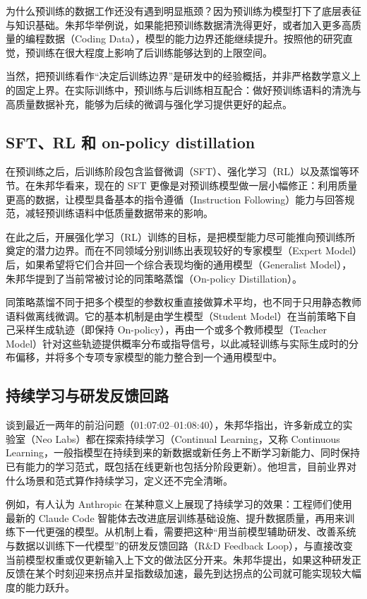 \documentclass[UTF8,a4paper,11pt,fontset=fandol]{ctexart}
\begin{document}
为什么预训练的数据工作还没有遇到明显瓶颈？因为预训练为模型打下了底层表征与知识基础。朱邦华举例说，如果能把预训练数据清洗得更好，或者加入更多高质量的编程数据（Coding Data），模型的能力边界还能继续提升。按照他的研究直觉，预训练在很大程度上影响了后训练能够达到的上限空间。

当然，把预训练看作“决定后训练边界”是研发中的经验概括，并非严格数学意义上的固定上界。在实际训练中，预训练与后训练相互配合：做好预训练语料的清洗与高质量数据补充，能够为后续的微调与强化学习提供更好的起点。

\subsection{SFT、RL 和 on-policy distillation}
在预训练之后，后训练阶段包含监督微调（SFT）、强化学习（RL）以及蒸馏等环节。在朱邦华看来，现在的 SFT 更像是对预训练模型做一层小幅修正：利用质量更高的数据，让模型具备基本的指令遵循（Instruction Following）能力与回答规范，减轻预训练语料中低质量数据带来的影响。

在此之后，开展强化学习（RL）训练的目标，是把模型能力尽可能推向预训练所奠定的潜力边界。而在不同领域分别训练出表现较好的专家模型（Expert Model）后，如果希望将它们合并回一个综合表现均衡的通用模型（Generalist Model），朱邦华提到了当前常被讨论的同策略蒸馏（On-policy Distillation）。

同策略蒸馏不同于把多个模型的参数权重直接做算术平均，也不同于只用静态教师语料做离线微调。它的基本机制是由学生模型（Student Model）在当前策略下自己采样生成轨迹（即保持 On-policy），再由一个或多个教师模型（Teacher Model）针对这些轨迹提供概率分布或指导信号，以此减轻训练与实际生成时的分布偏移，并将多个专项专家模型的能力整合到一个通用模型中。

\subsection{持续学习与研发反馈回路}
谈到最近一两年的前沿问题（01:07:02–01:08:40），朱邦华指出，许多新成立的实验室（Neo Labs）都在探索持续学习（Continual Learning，又称 Continuous Learning，一般指模型在持续到来的新数据或新任务上不断学习新能力、同时保持已有能力的学习范式，既包括在线更新也包括分阶段更新）。他坦言，目前业界对什么场景和范式算作持续学习，定义还不完全清晰。

例如，有人认为 Anthropic 在某种意义上展现了持续学习的效果：工程师们使用最新的 Claude Code 智能体去改进底层训练基础设施、提升数据质量，再用来训练下一代更强的模型。从机制上看，需要把这种“用当前模型辅助研发、改善系统与数据以训练下一代模型”的研发反馈回路（R\&D Feedback Loop），与直接改变当前模型权重或仅更新输入上下文的做法区分开来。朱邦华提出，如果这种研发正反馈在某个时刻迎来拐点并呈指数级加速，最先到达拐点的公司就可能实现较大幅度的能力跃升。
\end{document}
